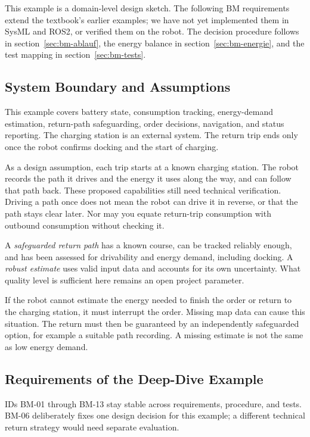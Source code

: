 This example is a domain-level design sketch. The following BM requirements extend the textbook's earlier examples; we have not yet implemented them in SysML and ROS2, or verified them on the robot. The decision procedure follows in section~\ref{sec:bm-ablauf}, the energy balance in section~\ref{sec:bm-energie}, and the test mapping in section~\ref{sec:bm-tests}.

\subsection{System Boundary and Assumptions}
This example covers battery state, consumption tracking, energy-demand estimation, return-path safeguarding, order decisions, navigation, and status reporting. The charging station is an external system. The return trip ends only once the robot confirms docking and the start of charging.

As a design assumption, each trip starts at a known charging station. The robot records the path it drives and the energy it uses along the way, and can follow that path back. These proposed capabilities still need technical verification. Driving a path once does not mean the robot can drive it in reverse, or that the path stays clear later. Nor may you equate return-trip consumption with outbound consumption without checking it.

A \emph{safeguarded return path} has a known course, can be tracked reliably enough, and has been assessed for drivability and energy demand, including docking. A \emph{robust estimate} uses valid input data and accounts for its own uncertainty. What quality level is sufficient here remains an open project parameter.

\begin{hinweisbox}
If the robot cannot estimate the energy needed to finish the order or return to the charging station, it must interrupt the order. Missing map data can cause this situation. The return must then be guaranteed by an independently safeguarded option, for example a suitable path recording. A missing estimate is not the same as low energy demand.
\end{hinweisbox}

\subsection{Requirements of the Deep-Dive Example}
IDs BM-01 through BM-13 stay stable across requirements, procedure, and tests. BM-06 deliberately fixes one design decision for this example; a different technical return strategy would need separate evaluation.

